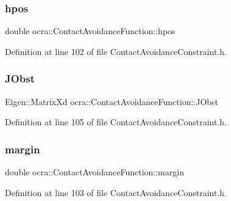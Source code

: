 \subsubsection{\texorpdfstring{hpos}{hpos}}
{\footnotesize\ttfamily double ocra\+::\+Contact\+Avoidance\+Function\+::hpos\hspace{0.3cm}{\ttfamily [protected]}}



Definition at line 102 of file Contact\+Avoidance\+Constraint.\+h.

\hypertarget{classocra_1_1ContactAvoidanceFunction_a233c509632182b45540a30b818254713}{}\label{classocra_1_1ContactAvoidanceFunction_a233c509632182b45540a30b818254713} 
\subsubsection{\texorpdfstring{J\+Obst}{JObst}}
{\footnotesize\ttfamily Eigen\+::\+Matrix\+Xd ocra\+::\+Contact\+Avoidance\+Function\+::\+J\+Obst\hspace{0.3cm}{\ttfamily [protected]}}



Definition at line 105 of file Contact\+Avoidance\+Constraint.\+h.

\hypertarget{classocra_1_1ContactAvoidanceFunction_a5a4c2e4dae17aef6c4cf6fa1b3be093e}{}\label{classocra_1_1ContactAvoidanceFunction_a5a4c2e4dae17aef6c4cf6fa1b3be093e} 
\subsubsection{\texorpdfstring{margin}{margin}}
{\footnotesize\ttfamily double ocra\+::\+Contact\+Avoidance\+Function\+::margin\hspace{0.3cm}{\ttfamily [protected]}}



Definition at line 103 of file Contact\+Avoidance\+Constraint.\+h.

\hypertarget{classocra_1_1ContactAvoidanceFunction_a19eb96ace3a217e5ea1c80dec97eeeb2}{}\label{classocra_1_1ContactAvoidanceFunction_a19eb96ace3a217e5ea1c80dec97eeeb2} 
